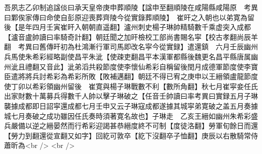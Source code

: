 吾夙志乙卯制追諡倓曰承天皇帝庚申葬順陵【諡申至翻順陵在咸陽縣咸陽原　考異曰鄴俟家傳曰命使自彭原迎喪葬齊陵今從實錄葬順陵】　崔旰之入朝也以弟寛為留後【是年四月壬寅崔旰入朝朝直遥翻】瀘州刺史楊子琳帥精騎數千乘虚突入成都【瀘音盧帥讀曰率騎奇計翻】朝廷聞之加旰檢校工部尚書賜名寜【校古孝翻尚辰羊翻　考異曰舊傳旰初為杜鴻漸行軍司馬即改名寜今從實録】遣還鎮　六月壬辰幽州兵馬使朱希彩經略副使昌平朱泚【使疎吏翻昌平本漢軍都縣後魏更名昌平縣唐属幽州泚且禮翻又音此】泚弟滔共殺節度使李懷仙希彩自稱留後閏月成德軍節度使李寶臣遣將將兵討希彩為希彩所敗【敗補邁翻】朝廷不得已宥之庚申以王縉領盧龍節度使丁卯以希彩領幽州留後　崔寛與楊子琳戰數不利【數所角翻】秋七月崔寜妾任氏出家財數十萬募兵得數千人帥以擊子琳破之【任音壬帥讀曰率考異曰實録五月子琳襲據成都即日詔寜還成都七月壬申又云子琳寇成都遂據其城寜弟寛破之盖五月奏據城七月奏破之成功雖因任氏奏時須著寛名故也】子琳走　乙亥王縉如幽州朱希彩盛兵嚴備以逆之縉晏然而行希彩迎謁甚恭縉度終不可制【度徒洛翻】勞軍旬餘日而還【勞力到翻還從宣翻又如字】回紇可敦卒【紇下沒翻卒子恤翻】庚辰以右散騎常侍蕭昕為<br />
<br />
